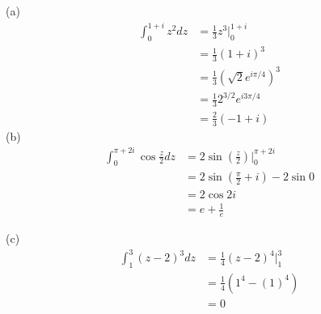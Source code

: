 \documentclass{article}
\begin{document}
(a)
\begin{align*}
    \int_0^{1+i} z^2 dz & = \frac{1}{3} z^3 \Big |_0^{1+i}    \\
                        & = \frac{1}{3}(1+ i)^3               \\
                        & = \frac{1}{3}(\sqrt{2}e^{i\pi/4})^3 \\
                        & = \frac{1}{3}2^{3/2}e^{i{3\pi/4}}   \\
                        & = \frac{2}{3}(-1+i)
\end{align*}
(b)
\begin{align*}
    \int_0^{\pi + 2i} \cos \frac{z}{2}dz & = 2\sin(\frac{z}{2}) \Big |_0^{\pi +2i} \\
                                         & =2\sin(\frac{\pi}{2} + i) - 2\sin 0     \\
                                         & =2\cos 2i                               \\
                                         & = e + \frac{1}{e}
\end{align*}

(c)
\begin{align*}
    \int_1^3(z - 2)^3 dz & = \frac{1}{4}(z - 2)^4 \Big |_1^3 \\
                         & = \frac{1}{4}(1^4 - (1)^4)        \\
                         & = 0
\end{align*}
\end{document}
